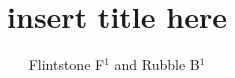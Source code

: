 \documentclass[a4paper]{jpconf}
\begin{document}
\title{insert title here}

\author{Flintstone F$^1$ and Rubble B$^1$}

\address{$^1$ Bedrock}




% 
% 
% 

\par

\end{document}
